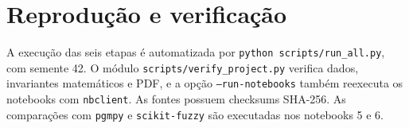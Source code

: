 \documentclass[12pt,a4paper]{article}
\begin{document}
\section{Reprodução e verificação}
A execução das seis etapas é automatizada por \texttt{python scripts/run\_all.py}, com semente 42. O módulo \texttt{scripts/verify\_project.py} verifica dados, invariantes matemáticos e PDF, e a opção \texttt{--run-notebooks} também reexecuta os notebooks com \texttt{nbclient}. As fontes possuem checksums SHA-256. As comparações com \texttt{pgmpy} e \texttt{scikit-fuzzy} são executadas nos notebooks 5 e 6.
\end{document}
